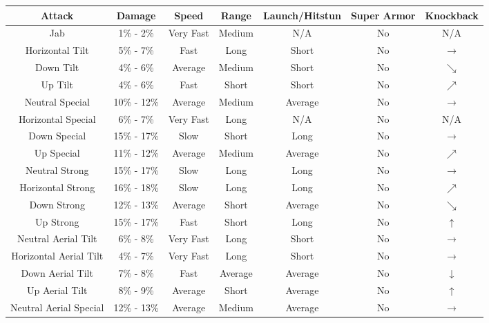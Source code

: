 \begin{table}[h!]
    \centering
    \begin{tabular}{| c | c | c | c | c | c | c |}
        \hline
        \textbf{Attack} & \textbf{Damage} & \textbf{Speed} & \textbf{Range} & \textbf{Launch/Hitstun} & \textbf{Super Armor} & \textbf{Knockback} \\
        \hline
        Jab & 1\% - 2\% & Very Fast & Medium & N/A & No & N/A \\
        \hline
        Horizontal Tilt & 5\% - 7\% & Fast & Long & Short & No & $\rightarrow$ \\
        \hline
        Down Tilt & 4\% - 6\% & Average & Medium & Short & No & $\searrow$ \\
        \hline
        Up Tilt & 4\% - 6\% & Fast & Short & Short & No & $\nearrow$ \\
        \hline
        Neutral Special & 10\% - 12\% & Average & Medium & Average & No & $\rightarrow$ \\
        \hline
        Horizontal Special & 6\% - 7\% & Very Fast & Long & N/A & No & N/A \\
        \hline
        Down Special & 15\% - 17\% & Slow & Short & Long & No & $\rightarrow$ \\
        \hline
        Up Special & 11\% - 12\% & Average & Medium & Average & No & $\nearrow$ \\
        \hline
        Neutral Strong & 15\% - 17\% & Slow & Long & Long & No & $\rightarrow$ \\
        \hline
        Horizontal Strong & 16\% - 18\% & Slow & Long & Long & No & $\nearrow$ \\
        \hline
        Down Strong & 12\% - 13\% & Average & Short & Average & No & $\searrow$ \\
        \hline
        Up Strong & 15\% - 17\% & Fast & Short & Long & No & $\uparrow$ \\
        \hline
        Neutral Aerial Tilt & 6\% - 8\% & Very Fast & Long & Short & No & $\rightarrow$ \\
        \hline
        Horizontal Aerial Tilt & 4\% - 7\% & Very Fast & Long & Short & No & $\rightarrow$ \\
        \hline
        Down Aerial Tilt & 7\% - 8\% & Fast & Average & Average & No & $\downarrow$ \\
        \hline
        Up Aerial Tilt & 8\% - 9\% & Average & Short & Average & No & $\uparrow$ \\
        \hline
        Neutral Aerial Special & 12\% - 13\% & Average & Medium & Average & No & $\rightarrow$ \\

\end{tabular}
\end{table}
